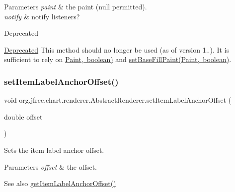 \begin{DoxyParams}{Parameters}
{\em paint} & the paint ({\ttfamily null} permitted). \\
\hline
{\em notify} & notify listeners?\\
\hline
\end{DoxyParams}
\begin{DoxyRefDesc}{Deprecated}
\item[\mbox{\hyperlink{deprecated__deprecated000119}{Deprecated}}]This method should no longer be used (as of version 1..). It is sufficient to rely on \mbox{\hyperlink{}{Paint, boolean)}} and \mbox{\hyperlink{classorg_1_1jfree_1_1chart_1_1renderer_1_1_abstract_renderer_a4459e5fa0bd6b01b1c7ba2083c1aa6f4}{set\+Base\+Fill\+Paint(\+Paint, boolean)}}. \end{DoxyRefDesc}
\mbox{\label{classorg_1_1jfree_1_1chart_1_1renderer_1_1_abstract_renderer_a5699fb01b06e7c7ce94d84f11bf60fa2}} 
\subsubsection{\texorpdfstring{set\+Item\+Label\+Anchor\+Offset()}{setItemLabelAnchorOffset()}}
{\footnotesize\ttfamily void org.\+jfree.\+chart.\+renderer.\+Abstract\+Renderer.\+set\+Item\+Label\+Anchor\+Offset (\begin{DoxyParamCaption}\item[{double}]{offset }\end{DoxyParamCaption})}

Sets the item label anchor offset.


\begin{DoxyParams}{Parameters}
{\em offset} & the offset.\\
\hline
\end{DoxyParams}
\begin{DoxySeeAlso}{See also}
\mbox{\hyperlink{classorg_1_1jfree_1_1chart_1_1renderer_1_1_abstract_renderer_aa93f126961e34db9be7db41e8b04054a}{get\+Item\+Label\+Anchor\+Offset()}} 
\end{DoxySeeAlso}
\mbox{\label{classorg_1_1jfree_1_1chart_1_1renderer_1_1_abstract_renderer_a70aac956bd7c7c1907639e13bb845b37}} 
